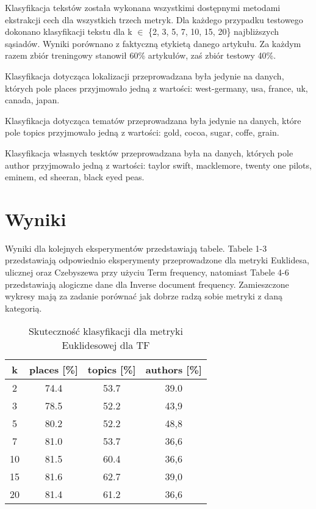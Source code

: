 \documentclass{classrep}
\begin{document}
Klasyfikacja tekstów została wykonana wszystkimi dostępnymi metodami ekstrakcji cech dla wszystkich trzech metryk. Dla każdego przypadku testowego dokonano klasyfikacji tekstu dla k $\in$ \{2, 3, 5, 7, 10, 15, 20\} najbliższych sąsiadów. Wyniki porównano z faktyczną etykietą danego artykułu. Za każdym razem zbiór treningowy stanowił 60\% artykułów, zaś zbiór testowy 40\%. \newline

Klasyfikacja dotycząca lokalizacji przeprowadzana była jedynie na danych, których pole places przyjmowało jedną z wartości: west-germany, usa, france, uk, canada, japan. \newline

Klasyfikacja dotycząca tematów przeprowadzana była jedynie na danych, które pole topics przyjmowało jedną z wartości: gold, cocoa, sugar, coffe, grain. \newline

Klasyfikacja własnych tesktów przeprowadzana była na danych, których pole author przyjmowało jedną z wartości: taylor swift, macklemore, twenty one pilots, eminem, ed sheeran, black eyed peas.

\section{Wyniki}

Wyniki dla kolejnych eksperymentów przedstawiają tabele. Tabele 1-3 przedstawiają odpowiednio eksperymenty przeprowadzone dla metryki Euklidesa, ulicznej oraz Czebyszewa przy użyciu Term frequency, natomiast Tabele 4-6 przedstawiają alogiczne dane dla Inverse document frequency. Zamieszczone wykresy mają za zadanie porównać jak dobrze radzą sobie metryki z daną kategorią.

\begin{table}[H]
	\centering
	\begin{tabular}{c c c c} 
		\hline
		\textbf{k} & \textbf{places [\%]} & \textbf{topics [\%]} &  \textbf{authors [\%]} \\ [0.5ex] 
		\hline
		\hline 
		2 & 74.4 & 53.7 & 39.0 \\ 
		3 & 78.5 & 52.2 & 43,9 \\
		5 & 80.2 & 52.2 & 48,8 \\
		7 & 81.0 & 53.7 & 36,6 \\
		10 & 81.5 & 60.4 & 36,6 \\
		15 & 81.6 & 62.7 & 39,0 \\
		20 & 81.4 & 61.2 & 36,6 \\ 
		\hline
	\end{tabular}
	\caption{Skuteczność klasyfikacji dla metryki Euklidesowej dla TF}
\end{table}
\end{document}
